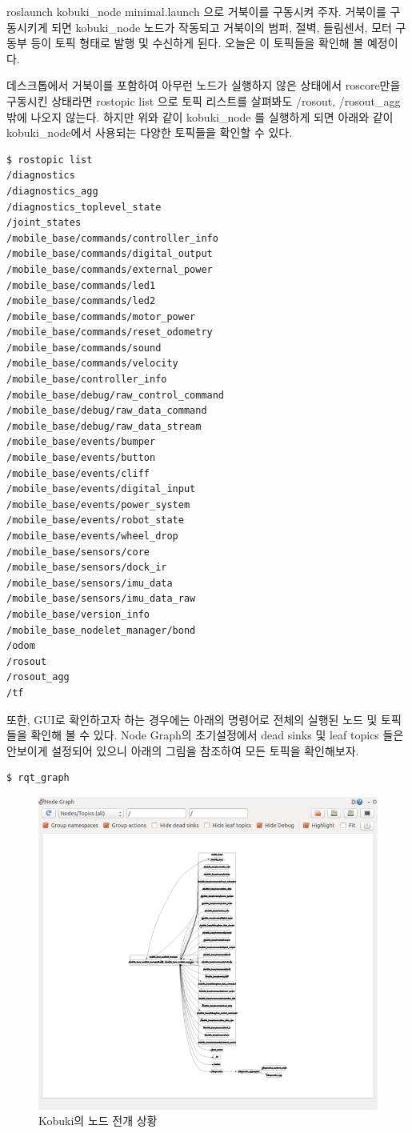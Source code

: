 roslaunch kobuki\_node minimal.launch 으로 거북이를 구동시켜 주자. 거북이를 구동시키게 되면 kobuki\_node 노드가 작동되고 거북이의 범퍼, 절벽, 들림센서, 모터 구동부 등이 토픽 형태로 발행 및 수신하게 된다.  오늘은 이 토픽들을 확인해 볼 예정이다.

데스크톱에서 거북이를 포함하여 아무런 노드가 실행하지 않은 상태에서 roscore만을 구동시킨 상태라면 rostopic list 으로 토픽 리스트를 살펴봐도 /rosout, /rosout\_agg 밖에 나오지 않는다. 하지만 위와 같이 kobuki\_node 를 실행하게 되면 아래와 같이 kobuki\_node에서 사용되는 다양한 토픽들을 확인할 수 있다.

\begin{lstlisting}[language=ROS]
$ rostopic list
/diagnostics
/diagnostics_agg
/diagnostics_toplevel_state
/joint_states
/mobile_base/commands/controller_info
/mobile_base/commands/digital_output
/mobile_base/commands/external_power
/mobile_base/commands/led1
/mobile_base/commands/led2
/mobile_base/commands/motor_power
/mobile_base/commands/reset_odometry
/mobile_base/commands/sound
/mobile_base/commands/velocity
/mobile_base/controller_info
/mobile_base/debug/raw_control_command
/mobile_base/debug/raw_data_command
/mobile_base/debug/raw_data_stream
/mobile_base/events/bumper
/mobile_base/events/button
/mobile_base/events/cliff
/mobile_base/events/digital_input
/mobile_base/events/power_system
/mobile_base/events/robot_state
/mobile_base/events/wheel_drop
/mobile_base/sensors/core
/mobile_base/sensors/dock_ir
/mobile_base/sensors/imu_data
/mobile_base/sensors/imu_data_raw
/mobile_base/version_info
/mobile_base_nodelet_manager/bond
/odom
/rosout
/rosout_agg
/tf
\end{lstlisting}

또한, GUI로 확인하고자 하는 경우에는 아래의 명령어로 전체의 실행된 노드 및 토픽들을 확인해 볼 수 있다. Node Graph의 초기설정에서 dead sinks 및 leaf topics 들은 안보이게 설정되어 있으니 아래의 그림을 참조하여 모든 토픽을 확인해보자.

\begin{lstlisting}[language=ROS]
$ rqt_graph
\end{lstlisting}

\begin{figure}[h]
\centering\includegraphics[width=0.5\columnwidth]{pictures/chapter10/rqt_graph_kobuki.png}
\caption{Kobuki의 노드 전개 상황}
\end{figure}

